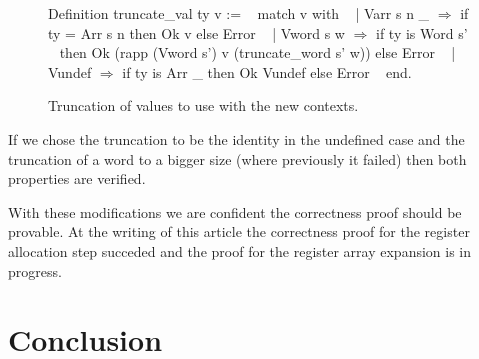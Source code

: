 \documentclass{article}
\begin{document}
\begin{figure}[t]
\obeylines\obeyspaces\ttfamily%
Definition truncate\_val ty v :=
~ match v with
~ | Varr s n \_ \(\Rightarrow\) if ty = Arr s n then Ok v else Error
~ | Vword s w \(\Rightarrow\) if ty is Word s'
~   then Ok (rapp (Vword s') v (truncate\_word s' w)) else Error
~ | Vundef \(\Rightarrow\) if ty is Arr \_ then Ok Vundef else Error
~ end.
\normalfont%
\caption{Truncation of values to use with the new contexts.}
\end{figure}

If we chose the truncation to be the identity in the undefined case and the
truncation of a word to a bigger size (where previously it failed) then both
properties are verified.

\medskip

With these modifications we are confident the correctness proof should be
provable. At the writing of this article the correctness proof for the register
allocation step succeded and the proof for the register array expansion is in
progress.

\section{Conclusion}\label{sec:ccl}
\end{document}
